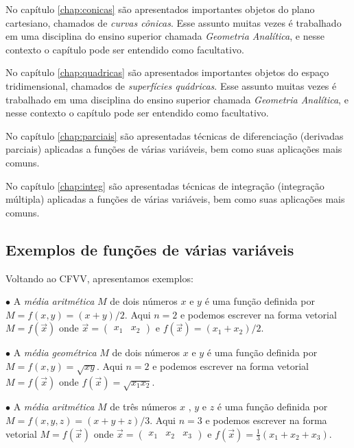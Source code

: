 No capítulo \ref{chap:conicas}  são apresentados importantes objetos do plano cartesiano, chamados de {\it curvas cônicas}. Esse assunto muitas vezes é trabalhado em uma disciplina do ensino superior chamada {\it Geometria Analítica}, e nesse contexto o capítulo pode ser entendido como facultativo.

No capítulo \ref{chap:quadricas}  são apresentados importantes objetos do espaço tridimensional, chamados de {\it superfícies quádricas}. Esse assunto muitas vezes é trabalhado em uma disciplina do ensino superior chamada {\it Geometria Analítica}, e nesse contexto o capítulo pode ser entendido como facultativo.

No capítulo \ref{chap:parciais} são apresentadas técnicas de diferenciação (derivadas parciais) aplicadas a funções de várias variáveis, bem como suas aplicações mais comuns.

No capítulo \ref{chap:integ} são apresentadas técnicas de integração (integração múltipla) aplicadas a funções de várias variáveis, bem como suas aplicações mais comuns.

\subsection{Exemplos de funções de várias variáveis} \label{ssec:execfvv}

Voltando ao CFVV, apresentamos exemplos:

\smallskip

$\bullet$ A {\it média aritmética} $M$ de dois números $x$ e $y$ é uma função definida por $M=f(x,y)=(x+y)/2$. Aqui $n=2$ e podemos escrever na forma vetorial $M = f\left(\vec{x}\right) $ onde $\vec{x}=\left( \begin{array}{cc}
x_1 & x_2 \end{array} \right) $ e $f\left(\vec{x}\right) = (x_1 + x_2)/2$.

\medskip

$\bullet$ A {\it média geométrica} $M$ de dois números $x$ e $y$ é uma função definida por $M=f(x,y) = \sqrt{x y} $. Aqui $n=2$ e podemos escrever na forma vetorial $M = f\left( \vec{x}\right)$ onde $f\left(\vec{x}\right) = \sqrt{x_1 x_2}$.

\medskip

$\bullet$ A {\it média aritmética} $M$ de três números $x$ , $y$ e $z$ é uma função definida por $M=f(x,y,z)=(x+y+z)/3$. Aqui $n=3$ e podemos escrever na forma vetorial $M = f\left(\vec{x}\right) $ onde $\vec{x}=\left( \begin{array}{ccc} 
x_1 & x_2 & x_3 \end{array} \right) $ e $f\left(\vec{x}\right) = \frac{1}{3}(x_1 + x_2 + x_3)$.

